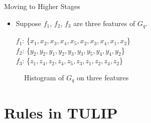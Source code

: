 \documentclass[
 size=14pt,
 paper=smartboard,  %
 mode=present, 		%
 display=slides, 	%
 style=tuliplab,  	%
 pauseslide,
 fleqn,leqno]{powerdot}
\begin{document}
\begin{slide}{Moving to Higher Stages}
\begin{itemize}
\item
\smallskip
Suppose $f_1$, $f_2$, $f_3$ are three features of $G_q$.

$f_1$: \{$x_1, x_2, x_3, x_4, x_5, x_2, x_3, x_4, x_1, x_2$\} \\

$f_2$: \{$y_2, y_2, y_1, y_2, y_3, y_3, y_5, y_4, y_4, y_2$\} \\

$f_3$: \{$z_1, z_4, z_2, z_4, z_5, z_3, z_1, z_2, z_4, z_2$\} \\
\end{itemize}

\begin{figure}[htbp]
    \centering
    \caption{Histogram of $G_q$ on three features}
    \label{fig:fre-dis-each-feature}
\end{figure}

\end{slide}


\section{Rules in TULIP}
\end{document}
